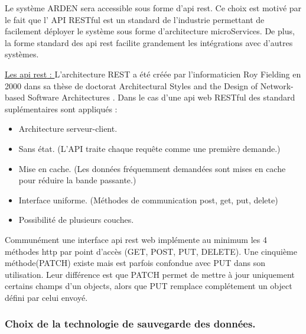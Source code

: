 Le système ARDEN sera accessible sous forme d'\gls{api} \gls{rest}. Ce choix est motivé par le fait que l' API RESTful est un standard de l'industrie permettant de facilement déployer le système sous forme d'architecture microServices. De plus, la forme standard des \gls{api} \gls{rest} facilite grandement les intégrations avec d'autres systèmes.

\begin{minipage}{0.90\textwidth}
 \underline{
  Les \gls{api} \gls{rest} :
 }
 L'architecture REST a été créée par l'informaticien Roy Fielding en 2000 dans sa thèse de doctorat Architectural Styles and the Design of Network-based Software Architectures . \cite{REST_theses}
 Dans le cas d'une \gls{api} web RESTful des standard suplémentaires sont appliqués :
 \begin{itemize}
  \item  Architecture serveur-client.
  \item Sans état. (L’API traite chaque requête comme une première demande.)
  \item Mise en cache. (Les données fréquemment demandées sont mises en cache pour réduire la bande passante.)
  \item Interface uniforme. (Méthodes de communication post, get, put, delete)
  \item Possibilité de plusieurs couches.
 \end{itemize}
 Communément une interface \gls{api} \gls{rest} web implémente au minimum les 4 méthodes http par point d'accès (GET, POST, PUT, DELETE). Une cinquième méthode(PATCH) existe mais est parfois confondue avec PUT dans son utilisation. Leur différence est que PATCH permet de mettre à jour uniquement certains champs d'un objects, alors que PUT remplace complétement un object défini par celui envoyé.
\end{minipage}


\justify
\subsubsection{Choix de la technologie de sauvegarde des données.}

